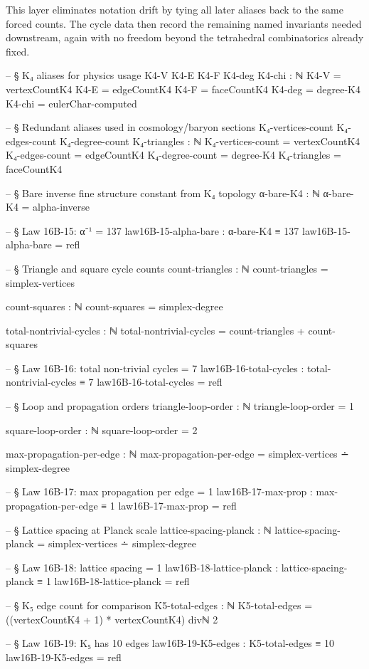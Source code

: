 \documentclass[11pt,a4paper]{book}
\begin{document}
This layer eliminates notation drift by tying all later aliases back to the same forced counts. The cycle data then record the remaining named invariants needed downstream, again with no freedom beyond the tetrahedral combinatorics already fixed.

\begin{code}
-- § K₄ aliases for physics usage
K4-V K4-E K4-F K4-deg K4-chi : ℕ
K4-V   = vertexCountK4
K4-E   = edgeCountK4
K4-F   = faceCountK4
K4-deg = degree-K4
K4-chi = eulerChar-computed

-- § Redundant aliases used in cosmology/baryon sections
K₄-vertices-count K₄-edges-count K₄-degree-count K₄-triangles : ℕ
K₄-vertices-count = vertexCountK4
K₄-edges-count    = edgeCountK4
K₄-degree-count   = degree-K4
K₄-triangles      = faceCountK4

-- § Bare inverse fine structure constant from K₄ topology
α-bare-K4 : ℕ
α-bare-K4 = alpha-inverse

-- § Law 16B-15: α⁻¹ = 137
law16B-15-alpha-bare : α-bare-K4 ≡ 137
law16B-15-alpha-bare = refl

-- § Triangle and square cycle counts
count-triangles : ℕ
count-triangles = simplex-vertices

count-squares : ℕ
count-squares = simplex-degree

total-nontrivial-cycles : ℕ
total-nontrivial-cycles = count-triangles + count-squares

-- § Law 16B-16: total non-trivial cycles = 7
law16B-16-total-cycles : total-nontrivial-cycles ≡ 7
law16B-16-total-cycles = refl

-- § Loop and propagation orders
triangle-loop-order : ℕ
triangle-loop-order = 1

square-loop-order : ℕ
square-loop-order = 2

max-propagation-per-edge : ℕ
max-propagation-per-edge = simplex-vertices ∸ simplex-degree

-- § Law 16B-17: max propagation per edge = 1
law16B-17-max-prop : max-propagation-per-edge ≡ 1
law16B-17-max-prop = refl

-- § Lattice spacing at Planck scale
lattice-spacing-planck : ℕ
lattice-spacing-planck = simplex-vertices ∸ simplex-degree

-- § Law 16B-18: lattice spacing = 1
law16B-18-lattice-planck : lattice-spacing-planck ≡ 1
law16B-18-lattice-planck = refl

-- § K₅ edge count for comparison
K5-total-edges : ℕ
K5-total-edges = ((vertexCountK4 + 1) * vertexCountK4) divℕ 2

-- § Law 16B-19: K₅ has 10 edges
law16B-19-K5-edges : K5-total-edges ≡ 10
law16B-19-K5-edges = refl
\end{code}
\end{document}
